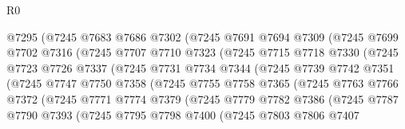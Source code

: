 \begin{lexlean}{R0}
\begin{coremodule}
                  @7295
                  (@7245
                    @7683
                    @7686
                    @7302
                    (@7245
                      @7691
                      @7694
                      @7309
                      (@7245
                        @7699
                        @7702
                        @7316
                        (@7245
                          @7707
                          @7710
                          @7323
                          (@7245
                            @7715
                            @7718
                            @7330
                            (@7245
                              @7723
                              @7726
                              @7337
                              (@7245
                                @7731
                                @7734
                                @7344
                                (@7245
                                  @7739
                                  @7742
                                  @7351
                                  (@7245
                                    @7747
                                    @7750
                                    @7358
                                    (@7245
                                      @7755
                                      @7758
                                      @7365
                                      (@7245
                                        @7763
                                        @7766
                                        @7372
                                        (@7245
                                          @7771
                                          @7774
                                          @7379
                                          (@7245
                                            @7779
                                            @7782
                                            @7386
                                            (@7245
                                              @7787
                                              @7790
                                              @7393
                                              (@7245
                                                @7795
                                                @7798
                                                @7400
                                                (@7245
                                                  @7803
                                                  @7806
                                                  @7407

\end{coremodule}
\end{lexlean}
